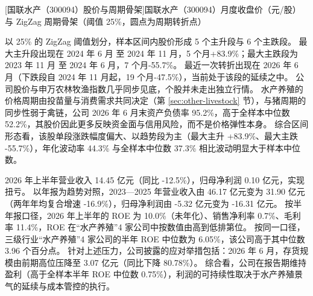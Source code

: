 \begin{center}
\begin{minipage}{\textwidth}\centering
{}

[国联水产（300094）股价与周期骨架]{国联水产（300094）月度收盘价（元/股）与 ZigZag 周期骨架（阈值 25\%，圆点为周期转折点）}
\end{minipage}
\end{center}

 以 25\% 的 ZigZag 阈值划分，样本区间内股价形成 5 个主升段与 6 个主跌段。 最大主升段出现在 2024 年 6 月 至 2024 年 11 月，5 个月+83.9\%；最大主跌段为 2023 年 11 月 至 2024 年 6 月，7 个月-55.7\%。 最近一次转折出现在 2026 年 6 月（下跌段自 2024 年 11 月起，19 个月-47.5\%），当前处于该段的延续之中。 公司股价与申万农林牧渔指数几乎同步见底，个股并未走出独立行情。 水产养殖的价格周期由投苗量与消费需求共同决定（第 \ref{sec:other-livestock} 节），与猪周期的同步性弱于禽链，公司 2026 年 6 月末资产负债率 95.2\%，高于全样本中位数 52.2\%，其股价因此更多反映资金面与信用风险，而不是价格弹性本身。 综合区间形态看，该股单段涨跌幅度偏大、以趋势段为主（最大主升 +83.9\%、最大主跌 -55.7\%），年化波动率 44.3\% 与全样本中位数 37.3\% 相比波动明显大于样本中位数。

 2026 年上半年营业收入 14.45 亿元（同比 -12.5\%），归母净利润 0.10 亿元，实现扭亏。 以年报为趋势对照，2023---2025 年营业收入由 46.17 亿元变为 31.90 亿元（两年年均复合增速 -16.9\%），归母净利润由 -5.32 亿元变为 -16.31 亿元。 按半年报口径，2026 年上半年的 ROE 为 10.0\%（未年化）、销售净利率 0.7\%、毛利率 11.4\%，ROE 在“水产养殖”4 家公司中按数值由高到低排第位。 按同一口径，三级行业“水产养殖”4 家公司的半年 ROE 中位数为 6.05\%，该公司高于其中位数 3.96 个百分点。 针对上述压力，公司披露的应对举措包括：2026 年 6 月，存货规模由前期高位压降至 3.07 亿元（同比下降 80.78\%）。 综合看，公司在报告期维持盈利（高于全样本半年 ROE 中位数 0.75\%），利润的可持续性取决于水产养殖景气的延续与成本管控的执行。

